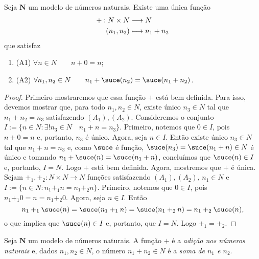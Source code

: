 \begin{teo}
	Seja $\bm N$ um modelo de números naturais. Existe uma única função
	\begin{align*}
	{+}: {N \times N} &\longrightarrow {N} \\{(n_1,n_2)} &\longmapsto {n_1+n_2}
	\end{align*}
que satisfaz
	\begin{enumerate}
	\item (A1) $\forall n \in N \qquad n + 0 = n$;
	\item (A2) $\forall n_1,n_2 \in N \qquad n_1 + \suce(n_2) = \suce(n_1+n_2)$.
	\end{enumerate}
\end{teo}
\begin{proof}
	Primeiro mostraremos que essa função $+$ está bem definida. Para isso, devemos mostrar que, para todo $n_1,n_2 \in N$, existe único $n_3 \in N$ tal que $n_1+n_2=n_3$ satisfazendo $(A_1),(A_2)$. Consideremos o conjunto $I := \{n \in N : \exists! n_3 \in N \quad n_1+n=n_3\}$. Primeiro, notemos que $0 \in I$, pois $n+0=n$ e, portanto, $n_3$ é único. Agora, seja $n \in I$. Então existe único $n_3 \in N$ tal que $n_1+n=n_3$ e, como $\suce$ é função, $\suce(n_3)=\suce(n_1+n) \in N$ é único e tomando $n_1+\suce(n)=\suce(n_1+n)$, concluímos que $\suce(n) \in I$ e, portanto, $I=N$. Logo $+$ está bem definida. Agora, mostremos que $+$ é única. Sejam $+_1,+_2:N \times N \to N$ funções satisfazendo $(A_1),(A_2)$, $n_1 \in N$ e $I := \{n \in N : n_1 +_1 n = n_1 +_2 n \}$. Primeiro, notemos que $0 \in I$, pois $n_1 +_1 0 =n = n_1 +_2 0$. Agora, seja $n \in I$. Então
	\begin{equation*}
	n_1 +_1 \suce(n) = \suce(n_1 +_1 n) = \suce(n_1 +_2 n) = n_1 +_2 \suce(n),
	\end{equation*}
o que implica que $\suce(n) \in I$ e, portanto, que $I=N$. Logo $+_1 = +_2$.
\end{proof}

\begin{defi}
	Seja $\bm N$ um modelo de números naturais. A função $+$ é a \emph{adição nos números naturais} e, dados $n_1,n_2 \in N$, o número $n_1 + n_2 \in N$ é a \emph{soma de $n_1$ e $n_2$}.
\end{defi}

